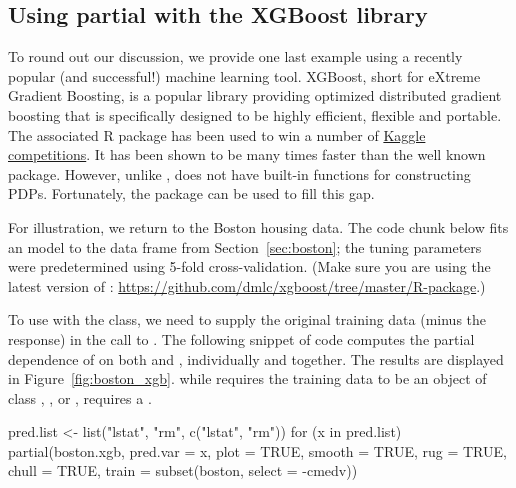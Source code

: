 \subsection{Using partial with the XGBoost library}
\label{sec:xgboost}

To round out our discussion, we provide one last example using a recently popular (and successful!) machine learning tool. XGBoost, short for eXtreme Gradient Boosting, is a popular library providing optimized distributed gradient boosting that is specifically designed to be highly efficient, flexible and portable. The associated R package  has been used to win a number of \href{https://www.kaggle.com/}{Kaggle competitions}. It has been shown to be many times faster than the well known  package. However, unlike ,  does not have built-in functions for constructing PDPs. Fortunately, the  package can be used to fill this gap.

For illustration, we return to the Boston housing data. The code chunk below fits an  model to the  data frame from Section~\ref{sec:boston}; the tuning parameters were predetermined using 5-fold cross-validation. (Make sure you are using the latest version of : \url{https://github.com/dmlc/xgboost/tree/master/R-package}.)

To use  with the  class, we need to supply the original training data (minus the response) in the call to . The following snippet of code computes the partial dependence of  on both  and , individually and together. The results are displayed in Figure~\ref{fig:boston_xgb}.  while  requires the training data to be an object of class , , or ,  requires a .
\begin{example}
pred.list <- list("lstat", "rm", c("lstat", "rm"))
for (x in pred.list) {
  partial(boston.xgb, pred.var = x, plot = TRUE, smooth = TRUE, rug = TRUE,
          chull = TRUE, train = subset(boston, select = -cmedv))
}
\end{example}

